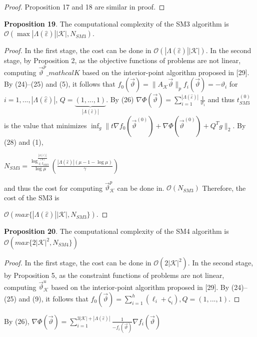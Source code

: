 \documentclass[]{iosart2c}
\begin{document}
\begin{proof}Proposition 17 and 18 are similar in proof.
\end{proof}
\textbf{Proposition 19}. The computational complexity of the
SM3 algorithm is $\mathcal{O}(\max{|\Lambda(\hat{\varepsilon} )| |\mathcal{K}|,N_{SM3}})$.
\begin{proof}In the first stage, the cost can be done in
$\mathcal{O}(|\Lambda(\hat{\varepsilon})| |\mathcal{K}|)$. In the second stage, by Proposition
2, as the objective functions of problems are not
linear, computing $\vec{\vartheta}^p\_mathcal{K}$
based on the interior-point algorithm
proposed in [29]. By (24)–(25) and (5), it
follows that $f_0(\vec{\vartheta}) = \parallel A_\mathcal{K}\vec{\vartheta}\parallel_p f_i(\vec{\vartheta}) = -\vartheta_i$ for $i =
1, ... , |\Lambda(\hat{\varepsilon})|$, $Q = \underbrace{(1, ... , 1)}_{|\Lambda(\hat{\varepsilon})|}$. By (26) $\nabla \Phi \left( \vec{\vartheta} \right) = \sum^{|\Lambda(\hat{\varepsilon})|}_{i=1} \frac{1}{\vartheta_i}$
and thus $t^{(0)}_{SM3}$ is the value that minimizes
$\inf_g \parallel t \nabla f_0 \left( \vec{\vartheta}^{(0)} \right) +\nabla \Phi \left( \vec{\vartheta}^{(0)} \right)+  Q^T g \parallel _2$. By (28)
and (1),

$N_{SM3} = \frac{ \log^{\frac{|\Lambda(\hat{\varepsilon})|}{(0)}}_{\in t_{SM3}}}{\log\mu} \left( \frac{ |\Lambda(\hat{\varepsilon})| (\mu - 1 - \log\mu)}{\gamma} \right)$

and thus the cost for computing $\vec{\vartheta}^p_\mathcal{K}$ can be done
in. $\mathcal{O}(N_{SM3})$ Therefore, the cost of the SM3 is

$\mathcal{O}(max\{|\Lambda(\hat{\varepsilon})| |\mathcal{K}|,N_{SM3}\})$.
\end{proof}
\textbf{Proposition 20}. The computational complexity of the
SM4 algorithm is $\mathcal{O}(max\{2|\mathcal{K}|^2,N_{SM4}\})$

\begin{proof}In the first stage, the cost can be done in
$\mathcal{O}(2 |\mathcal{K}|^2)$. In the second stage, by Proposition 5, as
the constraint functions of problems are not linear,
computing $\vec{\vartheta}^u_\mathcal{K}$
based on the interior-point algorithm
proposed in [29]. By (24)–(25) and (9), it follows that
$f_0\left(\vec{\vartheta}\right) = \sum^h_{i=1}(\ell_i + \zeta_i),Q = (1, ... , 1)$. 
\end{proof}
By (26), $\nabla \Phi \left( \vec{\vartheta} \right) = \sum^{3|\mathcal{K}|+|\Lambda(\hat{\varepsilon})|}_{i=1} \frac{1}{-f_i\left(\vec{\vartheta}\right)} \nabla f_i \left( \vec{\vartheta} \right)$
\end{document}
